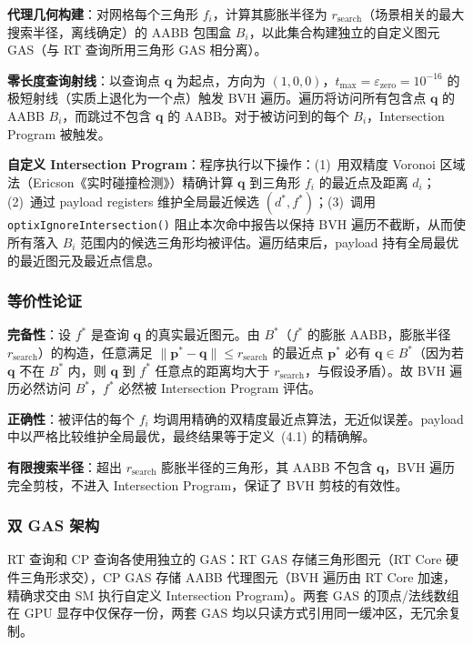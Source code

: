 \textbf{代理几何构建}：对网格每个三角形 $f_i$，计算其膨胀半径为 $r_{\text{search}}$（场景相关的最大搜索半径，离线确定）的 AABB 包围盒 $B_i$，以此集合构建独立的自定义图元 GAS（与 RT 查询所用三角形 GAS 相分离）。

\textbf{零长度查询射线}：以查询点 $\mathbf{q}$ 为起点，方向为 $(1, 0, 0)$，$t_{\max} = \varepsilon_{\text{zero}} = 10^{-16}$ 的极短射线（实质上退化为一个点）触发 BVH 遍历。遍历将访问所有包含点 $\mathbf{q}$ 的 AABB $B_i$，而跳过不包含 $\mathbf{q}$ 的 AABB。对于被访问到的每个 $B_i$，Intersection Program 被触发。

\textbf{自定义 Intersection Program}：程序执行以下操作：(1)~用双精度 Voronoi 区域法（Ericson《实时碰撞检测》）精确计算 $\mathbf{q}$ 到三角形 $f_i$ 的最近点及距离 $d_i$；(2)~通过 payload registers 维护全局最近候选 $(d^*, f^*)$；(3)~调用 \texttt{optixIgnoreIntersection()} 阻止本次命中报告以保持 BVH 遍历不截断，从而使所有落入 $B_i$ 范围内的候选三角形均被评估。遍历结束后，payload 持有全局最优的最近图元及最近点信息。

\subsubsection{等价性论证}

\textbf{完备性}：设 $f^*$ 是查询 $\mathbf{q}$ 的真实最近图元。由 $B^*$（$f^*$ 的膨胀 AABB，膨胀半径 $r_{\text{search}}$）的构造，任意满足 $\|\mathbf{p}^* - \mathbf{q}\| \le r_{\text{search}}$ 的最近点 $\mathbf{p}^*$ 必有 $\mathbf{q} \in B^*$（因为若 $\mathbf{q}$ 不在 $B^*$ 内，则 $\mathbf{q}$ 到 $f^*$ 任意点的距离均大于 $r_{\text{search}}$，与假设矛盾）。故 BVH 遍历必然访问 $B^*$，$f^*$ 必然被 Intersection Program 评估。

\textbf{正确性}：被评估的每个 $f_i$ 均调用精确的双精度最近点算法，无近似误差。payload 中以严格比较维护全局最优，最终结果等于定义~(4.1) 的精确解。

\textbf{有限搜索半径}：超出 $r_{\text{search}}$ 膨胀半径的三角形，其 AABB 不包含 $\mathbf{q}$，BVH 遍历完全剪枝，不进入 Intersection Program，保证了 BVH 剪枝的有效性。

\subsubsection{双 GAS 架构}

RT 查询和 CP 查询各使用独立的 GAS：RT GAS 存储三角形图元（RT Core 硬件三角形求交），CP GAS 存储 AABB 代理图元（BVH 遍历由 RT Core 加速，精确求交由 SM 执行自定义 Intersection Program）。两套 GAS 的顶点/法线数组在 GPU 显存中仅保存一份，两套 GAS 均以只读方式引用同一缓冲区，无冗余复制。

